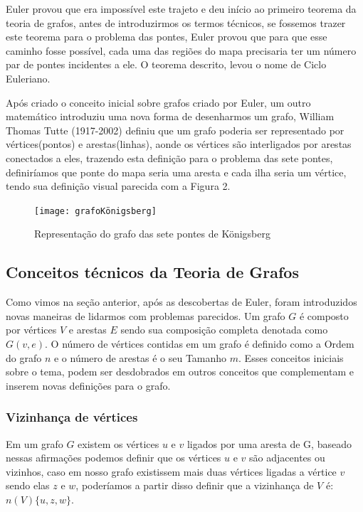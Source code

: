 \documentclass[12pt]{article}
\begin{document}
	Euler provou que era impossível este trajeto e deu início ao primeiro teorema da teoria de grafos, antes de introduzirmos os termos técnicos, se fossemos trazer este teorema para o problema das pontes, Euler provou que para que esse caminho fosse possível, cada uma das regiões do mapa precisaria ter um número par de pontes incidentes a ele. O teorema descrito, levou o nome de Ciclo Euleriano.
	
	Após criado o conceito inicial sobre grafos criado por Euler, um outro matemático introduziu uma nova forma de desenharmos um grafo, William Thomas Tutte (1917-2002) definiu que um grafo poderia ser representado por vértices(pontos) e arestas(linhas), aonde os vértices são interligados por arestas conectados a eles, trazendo esta definição para o problema das sete pontes, definiríamos que ponte do mapa seria uma aresta e cada ilha seria um vértice, tendo sua definição visual parecida com a Figura 2.
	
	
   \begin{figure}[!htb]
		\centering
		\texttt{[image: grafoKönigsberg]}
		\caption{Representação do grafo das sete pontes de Königsberg}    
	\end{figure}


	\subsection{Conceitos técnicos da Teoria de Grafos}
    Como vimos na seção anterior, após as descobertas de Euler, foram introduzidos novas maneiras de lidarmos com problemas parecidos.
	Um grafo $G$ é composto por vértices $V$ e arestas $E$ sendo sua composição completa denotada como $G (v, e)$. O número de vértices contidas em um grafo é definido como a Ordem do grafo $n$ e o número de arestas é o seu Tamanho $m$. Esses conceitos iniciais sobre o tema, podem ser desdobrados em outros conceitos que complementam e inserem novas definições para o grafo.
	
	\subsubsection{Vizinhança de vértices}
	
	Em um grafo $G$ existem os vértices $u$ e $v$ ligados por uma aresta de G, baseado nessas afirmações podemos definir que os vértices $u$ e $v$ são adjacentes ou vizinhos, caso em nosso grafo existissem mais duas vértices ligadas a vértice $v$ sendo elas $z$ e $w$, poderíamos a partir disso definir que a vizinhança de $V$ é: $n (V) \{u, z, w\}$. 
	
\end{document}
